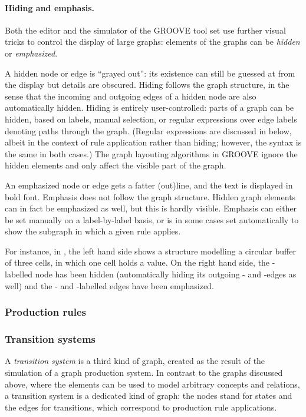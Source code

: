 \paragraph{Hiding and emphasis.}

Both the editor and the simulator of the GROOVE tool set use further visual
tricks to control the display of large graphs: elements of the graphs can be
\emph{hidden} or \emph{emphasized}. 

A hidden node or edge is ``grayed out'': its existence can still be guessed at
from the display but details are obscured. Hiding follows the graph structure,
in the sense that the incoming and outgoing edges of a hidden node are also
automatically hidden. Hiding is entirely user-controlled: parts of a graph can
be hidden, based on labels, manual selection, or regular expressions over edge
labels denoting paths through the graph. (Regular expressions are discussed in
 below, albeit in the context of rule application rather than
hiding; however, the syntax is the same in both cases.) The graph layouting
algorithms in GROOVE ignore the hidden elements and only affect the visible
part of the graph.

An emphasized node or edge gets a fatter (out)line, and the text is displayed
in bold font. Emphasis does not follow the graph structure. Hidden graph
elements can in fact be emphasized as well, but this is hardly visible.
Emphasis can either be set manually on a label-by-label basis, or is in some
cases set automatically to show the subgraph in which a given rule applies.

For instance, in , the left hand side shows a structure
modelling a circular buffer of three cells, in which one cell holds a value. On
the right hand side, the \Buffer-labelled node has been hidden (automatically
hiding its outgoing \First- and \Last-edges as well) and the \Val- and
\Next-labelled edges have been emphasized.


\subsubsection{Production rules}

\subsubsection{Transition systems}

A \emph{transition system} is a third kind of graph, created as the result of
the simulation of a graph production system. In contrast to the graphs
discussed above, where the elements can be used to model arbitrary concepts and
relations, a transition system is a dedicated kind of graph: the nodes stand
for states and the edges for transitions, which correspond to production rule
applications.


